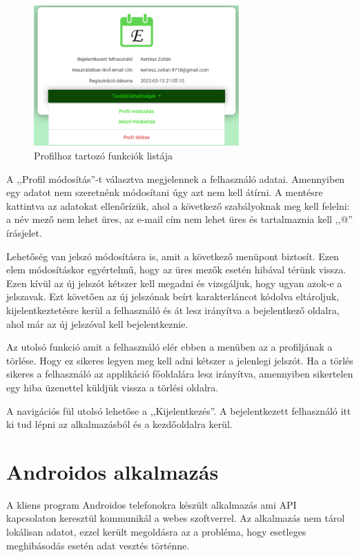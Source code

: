 \documentclass[
]{thesis-ekf}
\theoremstyle{definition}
\theoremstyle{remark}
\begin{document}
	\begin{figure}[ht!]
		\centering
		\includegraphics[width=0.7\textwidth]{web_app/web_profile_functions}
		\caption{Profilhoz tartozó funkciók listája}
		\label{figure:webapp_profile_functions}
	\end{figure}
	
	A ,,Profil módosítás''-t választva megjelennek a felhasználó adatai. Amennyiben egy adatot nem szeretnénk módosítani úgy azt nem kell átírni. A mentésre kattintva az adatokat ellenőrízük,  ahol a következő szabályoknak meg kell felelni: a név mező nem lehet üres, az e-mail cím nem lehet üres és tartalmaznia kell ,,@'' írásjelet.
	
	Lehetőség van jelszó módosításra is, amit a következő menüpont biztosít. Ezen elem módosításkor egyértelmű, hogy az üres mezők esetén hibával térünk vissza. Ezen kívül az új jelszót kétszer kell megadni és vizsgáljuk, hogy ugyan azok-e a jelszavak. Ezt követően az új jelszónak beírt karakterláncot kódolva eltároljuk, kijelentkeztetésre kerül a felhasználó és át lesz irányítva a bejelentkező oldalra, ahol már az új jelszóval kell bejelentkeznie.
	
	Az utolsó funkció amit a felhasználó elér ebben a menüben az a profiljának a törlése. Hogy ez sikeres legyen meg kell adni kétszer a jelenlegi jelszót. Ha a törlés sikeres a felhasználó az applikáció főoldalára lesz irányítva, amennyiben sikertelen egy hiba üzenettel küldjük vissza a törlési oldalra.
	
	A navigációs fül utolsó lehetőse a ,,Kijelentkezés''. A bejelentkezett felhasználó itt ki tud lépni az alkalmazásból és a kezdőoldalra kerül. 
	
	\section{Androidos alkalmazás}
	A kliens program Androidos telefonokra készült alkalmazás ami API~\cite{api_basic} kapcsolaton keresztül kommunikál a webes szoftverrel. Az alkalmazás nem tárol lokálisan adatot, ezzel került megoldásra az a probléma, hogy esetleges meghibásodás esetén adat vesztés történne. 
	
\end{document}
